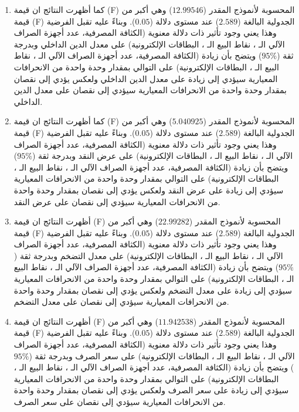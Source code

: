\documentclass[10pt,a4paper]{report}
\begin{document}
\begin{doublespacing}
\begin{enumerate}
    \item كما أظهرت النتائج ان قيمة (F) المحسوبة لأنموذج المقدر ($12.99546$) وهي أكبر من قيمة (F) الجدولية البالغة ($2.589$) عند مستوى دلالة ($0.05$). وبناءً عليه تقبل الفرضية وهذا يعني وجود تأثير ذات دلالة معنوية (الكثافة المصرفية، عدد أجهزة الصراف الآلي الـ ، نقاط البيع الـ ، البطاقات الإلكترونية) على معدل الدين الداخلي وبدرجة ثقة ($95\%$) ويتضح بأن زيادة (الكثافة المصرفية، عدد أجهزة الصراف الآلي الـ ، نقاط البيع الـ ، البطاقات الإلكترونية) على التوالي بمقدار وحدة واحدة من الانحرافات المعيارية سيؤدي إلى زيادة على معدل الدين الداخلي ولعكس يؤدي إلى نقصان بمقدار وحدة واحدة من الانحرافات المعيارية سيؤدي إلى نقصان على معدل الدين الداخلي.
\item كما أظهرت النتائج ان قيمة (F) المحسوبة لأنموذج المقدر ($5.040925$) وهي أكبر من قيمة (F) الجدولية البالغة ($2.589$) عند مستوى دلالة ($0.05$). وبناءً عليه تقبل الفرضية وهذا يعني وجود تأثير ذات دلالة معنوية (الكثافة المصرفية، عدد أجهزة الصراف الآلي الـ ، نقاط البيع الـ ، البطاقات الإلكترونية) على عرض النقد وبدرجة ثقة ($95\%$) ويتضح بأن زيادة (الكثافة المصرفية، عدد أجهزة الصراف الآلي الـ ، نقاط البيع الـ ، البطاقات الإلكترونية) على التوالي بمقدار وحدة واحدة من الانحرافات المعيارية سيؤدي إلى زيادة على عرض النقد ولعكس يؤدي إلى نقصان بمقدار وحدة واحدة من الانحرافات المعيارية سيؤدي إلى نقصان على عرض النقد.
\item أظهرت النتائج ان قيمة (F) المحسوبة لأنموذج المقدر ($22.99282$) وهي أكبر من قيمة (F) الجدولية البالغة ($2.589$) عند مستوى دلالة ($0.05$). وبناءً عليه تقبل الفرضية وهذا يعني وجود تأثير ذات دلالة معنوية (الكثافة المصرفية، عدد أجهزة الصراف الآلي الـ ، نقاط البيع الـ ، البطاقات الإلكترونية) على معدل التضخم وبدرجة ثقة ($95\%$) ويتضح بأن زيادة (الكثافة المصرفية، عدد أجهزة الصراف الآلي الـ ، نقاط البيع الـ ، البطاقات الإلكترونية) على التوالي بمقدار وحدة واحدة من الانحرافات المعيارية سيؤدي إلى زيادة على معدل التضخم ولعكس يؤدي إلى نقصان بمقدار وحدة واحدة من الانحرافات المعيارية سيؤدي إلى نقصان على معدل التضخم.
\item أظهرت النتائج ان قيمة (F) المحسوبة لأنموذج المقدر ($11.942538$) وهي أكبر من قيمة (F) الجدولية البالغة ($2.589$) عند مستوى دلالة ($0.05$). وبناءً عليه تقبل الفرضية وهذا يعني وجود تأثير ذات دلالة معنوية (الكثافة المصرفية، عدد أجهزة الصراف الآلي الـ ، نقاط البيع الـ ، البطاقات الإلكترونية) على سعر الصرف وبدرجة ثقة ($95\%$) ويتضح بأن زيادة (الكثافة المصرفية، عدد أجهزة الصراف الآلي الـ ، نقاط البيع الـ ، البطاقات الإلكترونية) على التوالي بمقدار وحدة واحدة من الانحرافات المعيارية سيؤدي إلى زيادة على سعر الصرف ولعكس يؤدي إلى نقصان بمقدار وحدة واحدة من الانحرافات المعيارية سيؤدي إلى نقصان على سعر الصرف.

\end{enumerate}
\end{doublespacing}
\end{document}
